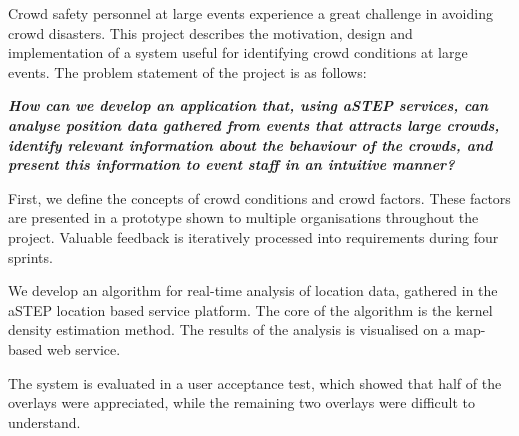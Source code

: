 Crowd safety personnel at large events experience a great challenge in avoiding crowd disasters. This project describes the motivation, design and implementation of a system useful for identifying crowd conditions at large events. The problem statement of the project is as follows:

\textbf{\textit{How can we develop an application that, using aSTEP services, can analyse position data gathered from events that attracts large crowds, identify relevant information about the behaviour of the crowds, and present this information to event staff in an intuitive manner?}}

First, we define the concepts of crowd conditions and crowd factors. These factors are presented in a prototype shown to multiple organisations throughout the project. Valuable feedback is iteratively processed into requirements during four sprints.

We develop an algorithm for real-time analysis of location data, gathered in the aSTEP location based service platform. The core of the algorithm is the kernel density estimation method. The results of the analysis is visualised on a map-based web service.

The system is evaluated in a user acceptance test, which showed that half of the overlays were appreciated, while the remaining two overlays were difficult to understand.



